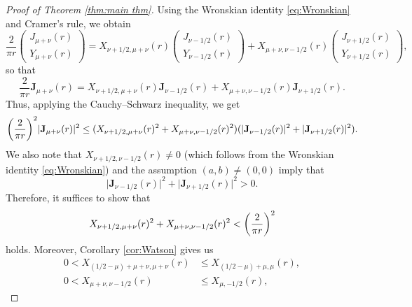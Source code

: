 \documentclass[reqno,letterpaper]{amsart}
\numberwithin{equation}{section}
\theoremstyle{plain}
\newcommand{\abs}[1]{\lvert#1\rvert}
\newcommand{\BesselJ}[1]{J_{#1}}
\newcommand{\BesselY}[1]{Y_{#1}}
\newcommand{\BesselJY}[1]{\mathbf{J}_{#1}}
\newcommand{\crossmunu}[2]{X_{#1, #2}}
\begin{document}
	\begin{proof}[Proof of Theorem \ref{thm:main thm}]
		Using the Wronskian identity \eqref{eq:Wronskian} and Cramer's rule, we obtain
		\begin{equation}
			\frac{2}{\pi r}
			\begin{pmatrix}
				\BesselJ{\mu + \nu}(r) \\
				\BesselY{\mu + \nu}(r)
			\end{pmatrix}
			= \crossmunu{\nu+1/2}{\mu + \nu}(r)
			\begin{pmatrix}
				\BesselJ{\nu-1/2}(r) \\
				\BesselY{\nu-1/2}(r)
			\end{pmatrix}
			+ \crossmunu{\mu + \nu}{\nu-1/2}(r)
			\begin{pmatrix}
				\BesselJ{\nu+1/2}(r) \\
				\BesselY{\nu+1/2}(r)
			\end{pmatrix} ,
		\end{equation} 
		so that
		\begin{equation}
			\frac{2}{\pi r} \BesselJY{\mu+\nu}(r) = \crossmunu{\nu+1/2}{\mu + \nu}(r) \BesselJY{\nu-1/2}(r) + \crossmunu{\mu + \nu}{\nu-1/2}(r) \BesselJY{\nu+1/2}(r) .
		\end{equation}
		Thus, applying the Cauchy--Schwarz inequality, we get
		\begin{equation}
		\mleft(\frac{2}{\pi r}\mright)^2 \abs{\BesselJY{\mu+\nu}(r)}^2 \leq (\crossmunu{\nu+1/2}{\mu + \nu}(r)^2 + \crossmunu{\mu + \nu}{\nu-1/2}(r)^2) ( \abs{\BesselJY{\nu-1/2}(r)}^2 + \abs{\BesselJY{\nu+1/2}(r)}^2 ) .
		\end{equation}
			We also note that $\crossmunu{\nu+1/2}{\nu-1/2}(r) \ne 0$ (which follows from the Wronskian identity \eqref{eq:Wronskian}) and the assumption $(a, b) \ne (0, 0)$ imply that 
		\begin{equation}
			\abs{\BesselJY{\nu-1/2}(r)}^2 + \abs{\BesselJY{\nu+1/2}(r)}^2 > 0 .
		\end{equation}
		Therefore, it suffices to show that 
		\begin{equation}
			\crossmunu{\nu+1/2}{\mu + \nu}(r)^2 + \crossmunu{\mu + \nu}{\nu-1/2}(r)^2 < \mleft(\frac{2}{\pi r}\mright)^2
		\end{equation}
		holds.
		Moreover, Corollary \ref{cor:Watson} gives us
		\begin{align}
			0 < \crossmunu{(1/2-\mu) + \mu + \nu}{\mu + \nu}(r) &\leq \crossmunu{(1/2-\mu) + \mu}{\mu}(r) , \\
			0 < \crossmunu{\mu + \nu}{\nu-1/2}(r) &\leq \crossmunu{\mu}{-1/2}(r) , 

\end{align}
\end{proof}
\end{document}

